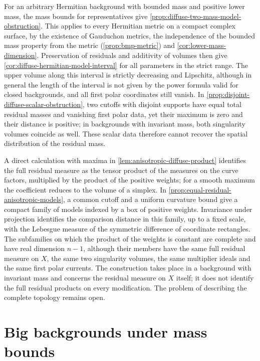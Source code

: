 For an arbitrary Hermitian background with bounded mass and positive lower mass, the mass bounds for representatives give \cref{prop:diffuse-two-mass-model-obstruction}. This applies to every Hermitian metric on a compact complex surface, by the existence of Gauduchon metrics, the independence of the bounded mass property from the metric (\cref{prop:bmp-metric}) and \cref{cor:lower-mass-dimension}. Preservation of residuals and additivity of volumes then give \cref{cor:diffuse-hermitian-model-interval} for all parameters in the strict range. The upper volume along this interval is strictly decreasing and Lipschitz, although in general the length of the interval is not given by the power formula valid for closed backgrounds, and all first polar coordinates still vanish. In \cref{prop:disjoint-diffuse-scalar-obstruction}, two cutoffs with disjoint supports have equal total residual masses and vanishing first polar data, yet their maximum is zero and their distance is positive; in backgrounds with invariant mass, both singularity volumes coincide as well. These scalar data therefore cannot recover the spatial distribution of the residual mass.

A direct calculation with maxima in \cref{lem:anisotropic-diffuse-product} identifies the full residual measure as the tensor product of the measures on the curve factors, multiplied by the product of the positive weights; for a smooth maximum the coefficient reduces to the volume of a simplex. In \cref{prop:equal-residual-anisotropic-models}, a common cutoff and a uniform curvature bound give a compact family of models indexed by a box of positive weights. Invariance under projection identifies the comparison distance in this family, up to a fixed scale, with the Lebesgue measure of the symmetric difference of coordinate rectangles. The subfamilies on which the product of the weights is constant are complete and have real dimension $n-1$, although their members have the same full residual measure on $X$, the same two singularity volumes, the same multiplier ideals and the same first polar currents. The construction takes place in a background with invariant mass and concerns the residual measure on $X$ itself; it does not identify the full residual products on every modification. The problem of describing the complete topology remains open.

\section{Big backgrounds under mass bounds}
\label{sec:history-bounded-mass-equations}


